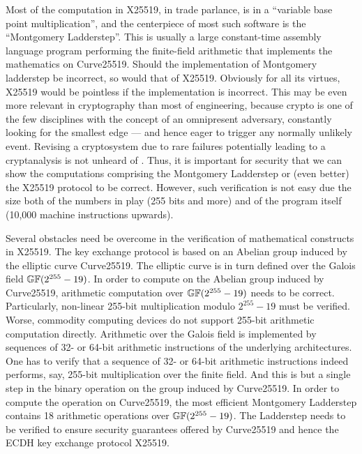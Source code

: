Most of the computation in X25519, in trade parlance, is in a
``variable base point multiplication'', and the centerpiece of most
such software is the ``Montgomery Ladderstep''. This is usually a
large constant-time assembly language program performing the
finite-field arithmetic that implements the mathematics on Curve25519.
Should the implementation of Montgomery ladderstep be incorrect, so
would that of X25519. Obviously for all its virtues, X25519 would be
pointless if the implementation is incorrect. This may be even more
relevant in cryptography than most of engineering, because crypto is
one of the few disciplines with the concept of an omnipresent
adversary, constantly looking for the smallest edge --- and hence
eager to trigger any normally unlikely event. Revising a cryptosystem
due to rare failures potentially leading to a cryptanalysis is not
unheard of .
Thus, it is important for security that we can show the computations
comprising the Montgomery Ladderstep or (even better) the X25519
protocol to be correct. However, such verification is not easy due
the size both of the numbers in play (255 bits and more) and of the
program itself (10,000 machine instructions upwards).

Several obstacles need be overcome in the verification of mathematical
constructs in X25519. The key exchange protocol is based on an
Abelian group induced by the elliptic curve Curve25519. The elliptic
curve is in turn defined over the Galois field $\mathbb{GF}(2^{255} - 19)$. 
In order to compute on the Abelian group induced by Curve25519,
arithmetic computation over $\mathbb{GF}(2^{255} - 19)$ needs to be
correct. Particularly, non-linear 255-bit multiplication modulo
$2^{255} - 19$ must be verified. Worse, commodity computing devices do
not support 255-bit arithmetic computation directly. Arithmetic over
the Galois field is implemented by sequences of 32- or 64-bit
arithmetic instructions of the underlying architectures. One has to
verify that a sequence of 32- or 64-bit arithmetic instructions indeed
performs, say, 255-bit multiplication over the finite field. And this
is but a single step in the binary operation on the group induced by
Curve25519. In order to compute the operation on Curve25519, 
the most efficient Montgomery Ladderstep contains 18 arithmetic 
operations over $\mathbb{GF}(2^{255} - 19)$. The Ladderstep needs to be
verified to ensure security guarantees offered by Curve25519 and hence 
the ECDH key exchange protocol X25519.

